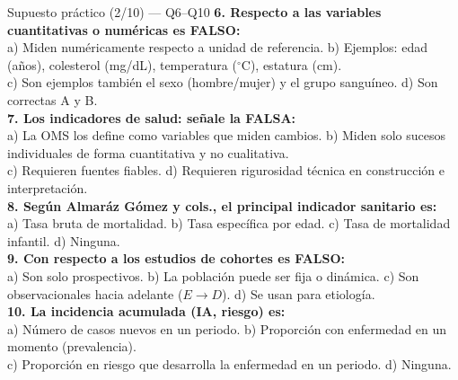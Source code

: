 \documentclass[aspectratio=169,8pt]{beamer}
\begin{document}
\begin{frame}{Supuesto pr\'actico (2/10) --- Q6--Q10}
  \scriptsize
  \textbf{6. Respecto a las variables cuantitativas o num\'ericas es FALSO:}\\
  a) Miden num\'ericamente respecto a unidad de referencia.\;
  b) Ejemplos: edad (a\~nos), colesterol (mg/dL), temperatura ($^\circ$C), estatura (cm).\\
  c) Son ejemplos tambi\'en el sexo (hombre/mujer) y el grupo sangu\'ineo. \;
  d) Son correctas A y B.\\[3pt]
  \textbf{7. Los indicadores de salud: se\~nale la FALSA:}\\
  a) La OMS los define como variables que miden cambios.\;
  b) Miden solo sucesos individuales de forma cuantitativa y no cualitativa.\\
  c) Requieren fuentes fiables.\; d) Requieren rigurosidad t\'ecnica en construcci\'on e interpretaci\'on.\\[3pt]
  \textbf{8. Seg\'un Almar\'az G\'omez y cols., el principal indicador sanitario es:}\\
  a) Tasa bruta de mortalidad.\; b) Tasa espec\'ifica por edad.\; c) Tasa de mortalidad infantil.\; d) Ninguna.\\[3pt]
  \textbf{9. Con respecto a los estudios de cohortes es FALSO:}\\
  a) Son solo prospectivos.\; b) La poblaci\'on puede ser fija o din\'amica.\; c) Son observacionales hacia adelante ($E\to D$).\; d) Se usan para etiolog\'ia.\\[3pt]
  \textbf{10. La incidencia acumulada (IA, riesgo) es:}\\
  a) N\'umero de casos nuevos en un periodo.\;
  b) Proporci\'on con enfermedad en un momento (prevalencia).\\
  c) Proporci\'on en riesgo que desarrolla la enfermedad en un periodo.\; d) Ninguna.
\end{frame}
\end{document}
